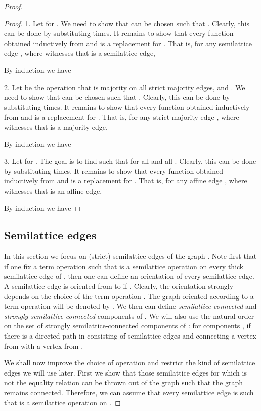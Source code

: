\documentclass[11pt]{article}
\begin{document}
\begin{proof}
\begin{proof}
1. Let  for . We need to show that  can be chosen such 
that . Clearly, this can be done by substituting  
 times. It remains to show that every function  obtained inductively 
from  and  is a replacement for . 
That is, for any semilattice edge , where  witnesses that  
is a semilattice edge,

By induction we have 


2. Let  be the operation that is majority on all strict majority edges, and . 
We need to show that  can be chosen such that . Clearly, this 
can be done by substituting   times. It remains to show 
that every function  obtained inductively from  and 
 is a replacement for . That is, for any 
strict majority edge , where  witnesses that  is a 
majority edge,

By induction we have 


3. Let  for . The goal is to find  such that 
 for 
all  and all . Clearly, this can be done by substituting  
 times. It remains to show that every function  obtained 
inductively from  and  
is a replacement for . That is, for any affine edge , 
where  witnesses that  is an affine edge,

By induction we have 

\end{proof}

\subsection{Semilattice edges}\label{sec:thin-semilattice}

In this section we focus on (strict) semilattice edges of the graph . Note
first that if one fix a term operation  such that  is a semilattice
operation on every thick semilattice edge of , then one can define
an orientation of every semilattice edge. A semilattice edge  is oriented from  
to  if . 
Clearly, the orientation strongly depends on 
the choice of the term operation . The graph  oriented
according to a term operation  will be denoted by . We
then can define {\em semilattice-connected} and {\em strongly semilattice-connected}
components of . We will also use the natural order on the
set of strongly semilattice-connected components of : for
components ,  if there is a directed path in 
consisting of semilattice edges and connecting a vertex from  with a vertex
from . 

We shall now improve the choice of operation  and restrict the kind of
semilattice edges we will use later.
First we show that those semilattice edges  for which  is not
the equality relation can be thrown out of the graph  such that
the graph remains connected. Therefore, we can assume that every semilattice
edge  is such that  is a semilattice operation on . 
 

\end{proof}
\end{document}
